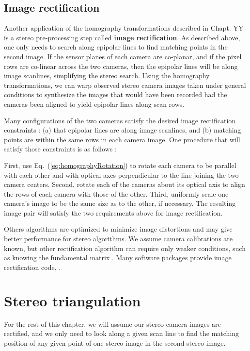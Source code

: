 \subsection{Image rectification}
Another application of the homography transformations described in Chapt. YY is a stereo pre-processing step called {\bf image rectification}.  As described above, one only needs to search along epipolar lines to find matching points in the second image.  If the sensor planes of each camera are co-planar, and if the pixel rows are co-linear across the two cameras, then the epipolar lines will be along image scanlines, simplifying the stereo search.  Using the homography transformations, we can warp observed stereo camera images taken under general conditions to synthesize the images that would have been recorded had the cameras been aligned to yield epipolar lines along scan rows.

Many configurations of the two cameras satisfy the desired image rectification constraints \cite{Zhang2003}: (a) that epipolar lines are along image scanlines, and (b) matching points are within the same rows in each camera image.  One procedure that will satisfy those constraints is as follows \cite{wikiRectification}:

First, use Eq.~(\ref{eq:homographyRotation}) to rotate each camera to be parallel with each other and with optical axes perpendicular to the line joining the two camera centers.  Second, rotate each of the cameras about its optical axis to align the rows of each camera with those of the other.  Third, uniformly scale one camera's image to be the same size as to the other, if necessary.  The resulting image pair will satisfy the two requirements above for image rectification.

Others algorithms are optimized to minimize image distortions \cite{Zhang2003} and may give better performance for stereo algorithms.  We assume camera calibrations are known, but other rectification algorithm can require only weaker conditions, such as knowing the fundamental matrix \cite{Hartley2004,Pollefeys99}. Many software packages provide image rectification code, \cite{github2022}.




\section{Stereo triangulation}

For the rest of this chapter, we will assume our stereo camera images are rectified, and we only need to look along a given scan line to find the matching position of any given point of one stereo image in the second stereo image.

